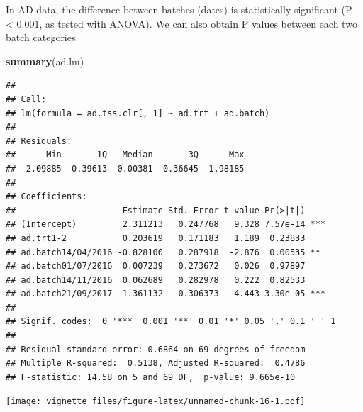 \documentclass[]{book}
\newenvironment{Shaded}{\begin{snugshade}}{\end{snugshade}}
\newcommand{\KeywordTok}[1]{\textcolor[rgb]{0.13,0.29,0.53}{\textbf{#1}}}
\newcommand{\DataTypeTok}[1]{\textcolor[rgb]{0.13,0.29,0.53}{#1}}
\newcommand{\DecValTok}[1]{\textcolor[rgb]{0.00,0.00,0.81}{#1}}
\newcommand{\StringTok}[1]{\textcolor[rgb]{0.31,0.60,0.02}{#1}}
\newcommand{\CommentTok}[1]{\textcolor[rgb]{0.56,0.35,0.01}{\textit{#1}}}
\newcommand{\OperatorTok}[1]{\textcolor[rgb]{0.81,0.36,0.00}{\textbf{#1}}}
\newcommand{\NormalTok}[1]{#1}
\begin{document}
In AD data, the difference between batches (dates) is statistically
significant (P \textless{} 0.001, as tested with ANOVA). We can also
obtain P values between each two batch categories.

\begin{Shaded}
\begin{Highlighting}[]
\KeywordTok{summary}\NormalTok{(ad.lm)}
\end{Highlighting}
\end{Shaded}

\begin{verbatim}
## 
## Call:
## lm(formula = ad.tss.clr[, 1] ~ ad.trt + ad.batch)
## 
## Residuals:
##      Min       1Q   Median       3Q      Max 
## -2.09885 -0.39613 -0.00381  0.36645  1.98185 
## 
## Coefficients:
##                     Estimate Std. Error t value Pr(>|t|)    
## (Intercept)         2.311213   0.247768   9.328 7.57e-14 ***
## ad.trt1-2           0.203619   0.171183   1.189  0.23833    
## ad.batch14/04/2016 -0.828100   0.287918  -2.876  0.00535 ** 
## ad.batch01/07/2016  0.007239   0.273672   0.026  0.97897    
## ad.batch14/11/2016  0.062689   0.282978   0.222  0.82533    
## ad.batch21/09/2017  1.361132   0.306373   4.443 3.30e-05 ***
## ---
## Signif. codes:  0 '***' 0.001 '**' 0.01 '*' 0.05 '.' 0.1 ' ' 1
## 
## Residual standard error: 0.6864 on 69 degrees of freedom
## Multiple R-squared:  0.5138, Adjusted R-squared:  0.4786 
## F-statistic: 14.58 on 5 and 69 DF,  p-value: 9.665e-10
\end{verbatim}

\begin{Shaded}
\end{Shaded}

\texttt{[image: vignette\_files/figure-latex/unnamed-chunk-16-1.pdf]}
\end{document}
